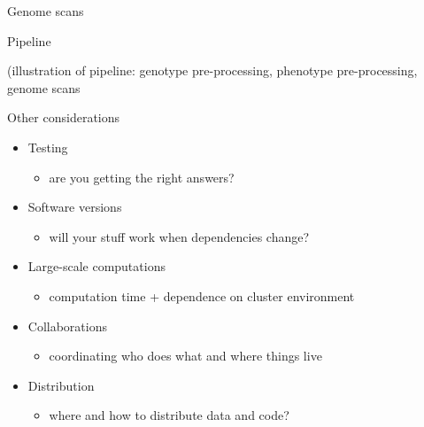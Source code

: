 \documentclass[aspectratio=169,12pt,t]{beamer}
\begin{document}
\begin{frame}[c]{Genome scans}




\end{frame}




\begin{frame}[c]{Pipeline}


(illustration of pipeline: genotype pre-processing, phenotype
  pre-processing, genome scans


\end{frame}





\begin{frame}[c]{Other considerations}

  \begin{itemize}
    \itemsep12pt
  \item Testing
    \begin{itemize}
    \item[] {\lolit are you getting the right answers?}
    \end{itemize}
  \item Software versions
    \begin{itemize}
    \item[] {\lolit will your stuff work when dependencies change?}
    \end{itemize}
  \item Large-scale computations
    \begin{itemize}
    \item[] {\lolit computation time + dependence on cluster environment}
    \end{itemize}
  \item Collaborations
    \begin{itemize}
    \item[] {\lolit coordinating who does what and where things live}
    \end{itemize}
  \item Distribution
    \begin{itemize}
    \item[] {\lolit where and how to distribute data and code?}
    \end{itemize}
  \end{itemize}


\end{frame}
\end{document}
